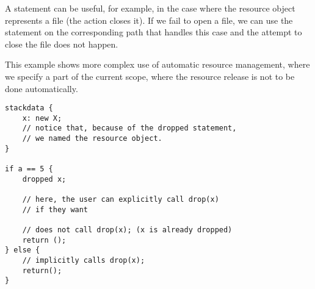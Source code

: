 A  statement can be useful, for example, in the case where the resource object represents a file (the  action closes it). If we fail to open a file, we can use the  statement on the corresponding path that handles this case and the attempt to close the file does not happen.

\begin{ex}
    This example shows more complex use of automatic resource management, where we specify a part of the current scope, where the resource release is not to be done automatically.

    \begin{lstlisting}
stackdata {
    x: new X;
    // notice that, because of the dropped statement,
    // we named the resource object.
}

if a == 5 {
    dropped x;

    // here, the user can explicitly call drop(x)
    // if they want

    // does not call drop(x); (x is already dropped)
    return ();
} else {
    // implicitly calls drop(x);
    return();
}
    \end{lstlisting}
\end{ex}
